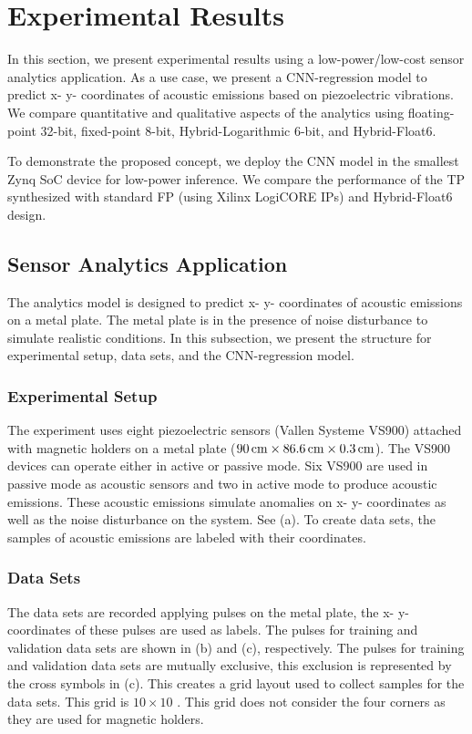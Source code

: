 \section{Experimental Results}
\label{sec:experimental_results}
In this section, we present experimental results using a low-power/low-cost sensor analytics application. As a use case, we present a CNN-regression model to predict x- y- coordinates of acoustic emissions based on piezoelectric vibrations. We compare quantitative and qualitative aspects of the analytics using floating-point 32-bit, fixed-point 8-bit, Hybrid-Logarithmic 6-bit, and Hybrid-Float6.

To demonstrate the proposed concept, we deploy the CNN model in the smallest Zynq SoC device for low-power inference. We compare the performance of the TP synthesized with standard FP (using Xilinx LogiCORE IPs) and Hybrid-Float6 design.

\subsection{Sensor Analytics Application}
The analytics model is designed to predict x- y- coordinates of acoustic emissions on a metal plate. The metal plate is in the presence of noise disturbance to simulate realistic conditions. In this subsection, we present the structure for experimental setup, data sets, and the CNN-regression model.

\subsubsection{Experimental Setup}
The experiment uses eight piezoelectric sensors (Vallen Systeme VS900) attached with magnetic holders on a metal plate ($\unit[90]{cm}\times\unit[86.6]{cm}\times\unit[0.3]{cm}$). The VS900 devices can operate either in active or passive mode. Six VS900 are used in passive mode as acoustic sensors and two in active mode to produce acoustic emissions. These acoustic emissions simulate anomalies on x- y- coordinates as well as the noise disturbance on the system. See (a). To create data sets, the samples of acoustic emissions are labeled with their coordinates.

\subsubsection{Data Sets}
The data sets are recorded applying pulses on the metal plate, the x- y- coordinates of these pulses are used as labels. The pulses for training and validation data sets are shown in (b) and (c), respectively. The pulses for training and validation data sets are mutually exclusive, this exclusion is represented by the cross symbols in (c). This creates a grid layout used to collect samples for the data sets. This grid is $10\times10$ . This grid does not consider the four corners as they are used for magnetic holders.

